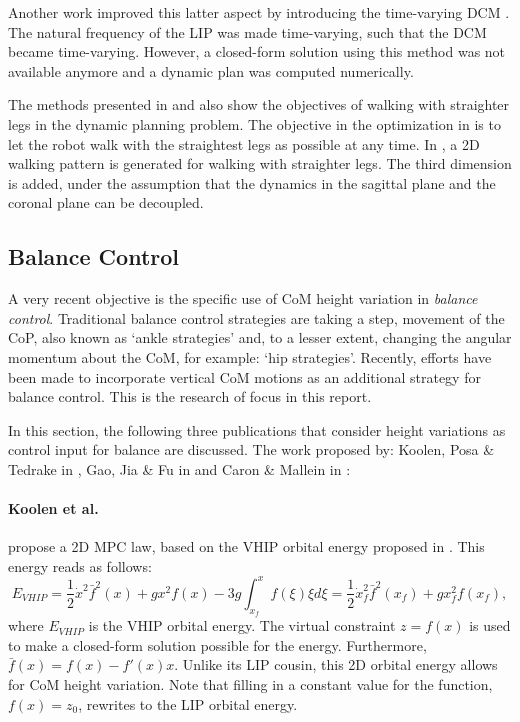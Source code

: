 Another work improved this latter aspect by introducing the time-varying \ac{DCM} \cite{hopkins2014humanoid}. The natural frequency of the \ac{LIP} was made time-varying, such that the \ac{DCM} became time-varying. However, a closed-form solution using this method was not available anymore and a dynamic plan was computed numerically.

The methods presented in \cite{brasseur2015robust} and \cite{kajita2017biped} also show the objectives of walking with straighter legs in the dynamic planning problem. The objective in the optimization in \cite{brasseur2015robust} is to let the robot walk with the straightest legs as possible at any time. In \cite{kajita2017biped}, a \ac{2D} walking pattern is generated for walking with straighter legs. The third dimension is added, under the assumption that the dynamics in the sagittal plane and the coronal plane can be decoupled. 
\subsection{Balance Control}\label{subsec:heightbalance}
A very recent objective is the specific use of \ac{CoM} height variation in \textit{balance control}. Traditional balance control strategies are taking a step, movement of the \ac{CoP}, also known as `ankle strategies' and, to a lesser extent, changing the angular momentum about the \ac{CoM}, for example: `hip strategies'. Recently, efforts have been made to incorporate vertical \ac{CoM} motions as an additional strategy for balance control. This is the research of focus in this report.

In this section, the following three publications that consider height variations as control input for balance are discussed. The work proposed by: Koolen, Posa \& Tedrake in \cite{koolen2016balance},  Gao, Jia \& Fu in \cite{gao2017increase} and  Caron \& Mallein in \cite{caron2018balance}:

\paragraph{Koolen et al.} propose a \ac{2D} \ac{MPC} law, based on the \ac{VHIP} orbital energy proposed in \cite{pratt2007derivation}. This energy reads as follows:
\begin{equation}\label{eq:evhip}
    E_{VHIP}  = \frac{1}{2}\dot{x}^2\bar{f}^2(x)+gx^2f(x) - 3g\int_{x_f}^{x} f(\xi)\xi d\xi = \frac{1}{2}\dot{x}_f^2\bar{f}^2(x_f)+gx_f^2f(x_f),
\end{equation}
where $E_{VHIP}$ is the \ac{VHIP} orbital energy. The virtual constraint $z=f(x)$ is used to make a closed-form solution possible for the energy. Furthermore, $\bar{f}(x)=f(x)-f'(x)x$. Unlike its \ac{LIP} cousin, this \ac{2D} orbital energy allows for \ac{CoM} height variation. Note that filling in a constant value for the function, $f(x)=z_0$, rewrites to the \ac{LIP} orbital energy.

